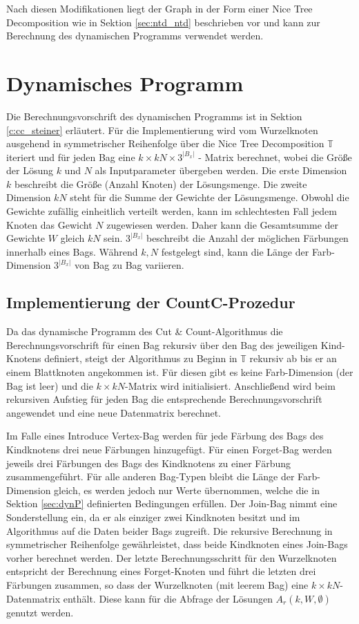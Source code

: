Nach diesen Modifikationen liegt der Graph in der Form einer Nice Tree Decomposition wie in Sektion \ref{sec:ntd_ntd} beschrieben vor und kann zur Berechnung des dynamischen Programms verwendet werden.

\section{Dynamisches Programm}
\label{sec:impl_dynP}
Die Berechnungsvorschrift des dynamischen Programms ist in Sektion \ref{c:cc_steiner} erläutert. 
Für die Implementierung wird vom Wurzelknoten ausgehend in symmetrischer Reihenfolge über die Nice Tree Decomposition $\mathbb{T}$ iteriert und für jeden Bag eine $k \times kN \times 3^{|B_x|}$ - Matrix berechnet, wobei die Größe der Lösung $k$ und $N$ als Inputparameter übergeben werden. 
Die erste Dimension $k$ beschreibt die Größe (Anzahl Knoten) der Lösungsmenge. 
Die zweite Dimension $kN$ steht für die Summe der Gewichte der Lösungsmenge. 
Obwohl die Gewichte zufällig einheitlich verteilt werden, kann im schlechtesten Fall jedem Knoten das Gewicht $N$ zugewiesen werden. 
Daher kann die Gesamtsumme der Gewichte $W$ gleich $kN$ sein.
$3^{|B_x|}$ beschreibt die Anzahl der möglichen Färbungen innerhalb eines Bags. 
Während $k,N$ festgelegt sind, kann die Länge der Farb-Dimension $3^{|B_x|}$ von Bag zu Bag variieren. 
\subsection{Implementierung der CountC-Prozedur}
\label{ssec:countc}
Da das dynamische Programm des Cut \& Count-Algorithmus die Berechnungsvorschrift für einen Bag rekursiv über den Bag des jeweiligen Kind-Knotens definiert, steigt der Algorithmus zu Beginn in $\mathbb{T}$ rekursiv ab bis er an einem Blattknoten angekommen ist. 
Für diesen gibt es keine Farb-Dimension (der Bag ist leer) und die $k \times kN$-Matrix wird initialisiert. 
Anschließend wird beim rekursiven Aufstieg für jeden Bag die entsprechende Berechnungsvorschrift angewendet und eine neue Datenmatrix berechnet. 

Im Falle eines \glqq Introduce Vertex\grqq -Bag werden für jede Färbung des Bags des Kindknotens drei neue Färbungen hinzugefügt.
Für einen \glqq Forget\grqq -Bag werden jeweils drei Färbungen des Bags des Kindknotens zu einer Färbung zusammengeführt.
Für alle anderen Bag-Typen bleibt die Länge der Farb-Dimension gleich, es werden jedoch nur Werte übernommen, welche die in Sektion \ref{sec:dynP} definierten Bedingungen erfüllen. 
Der \glqq Join\grqq -Bag nimmt eine Sonderstellung ein, da er als einziger zwei Kindknoten besitzt und im Algorithmus auf die Daten beider Bags zugreift. 
Die rekursive Berechnung in symmetrischer Reihenfolge gewährleistet, dass beide Kindknoten eines \glqq Join\grqq -Bags vorher berechnet werden. 
Der letzte Berechnungsschritt für den Wurzelknoten entspricht der Berechnung eines \glqq Forget\grqq -Knoten und führt die letzten drei Färbungen zusammen, so dass der Wurzelknoten (mit leerem Bag) eine $k \times kN$-Datenmatrix enthält. 
Diese kann für die Abfrage der Lösungen $A_r(k,W,\emptyset)$ genutzt werden.

